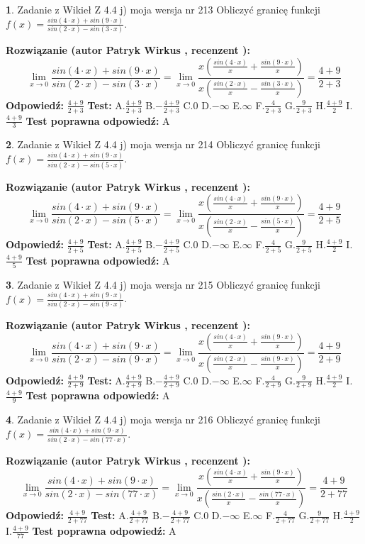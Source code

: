 \documentclass[12pt, a4paper]{article}
\theoremstyle{definition} %
\newtheorem{zad}{}
\newcommand{\zadStart}[1]{\begin{zad}#1\newline}
\newcommand{\zadStop}{\end{zad}}
\newcommand{\rozwStart}[2]{\noindent \textbf{Rozwiązanie (autor #1 , recenzent #2): }\newline}
\newcommand{\rozwStop}{\newline}
\newcommand{\odpStart}{\noindent \textbf{Odpowiedź:}\newline}
\newcommand{\odpStop}{\newline}
\newcommand{\testStart}{\noindent \textbf{Test:}\newline}
\newcommand{\testStop}{\newline}
\newcommand{\kluczStart}{\noindent \textbf{Test poprawna odpowiedź:}\newline}
\newcommand{\kluczStop}{\newline}
\begin{document}
\zadStart{Zadanie z Wikieł Z 4.4 j) moja wersja nr 213}
Obliczyć granicę funkcji $f(x)=\frac{sin(4\cdot x) +sin(9\cdot x)}{sin(2\cdot x) -sin(3\cdot x)}$.
\zadStop
\rozwStart{Patryk Wirkus}{}
$$\lim\limits_{x\to 0}\frac{sin(4\cdot x) +sin(9\cdot x)}{sin(2\cdot x) -sin(3\cdot x)}=\lim\limits_{x\to 0}\frac{x(\frac{sin(4\cdot x)}{x}+\frac{sin(9\cdot x)}{x})}{x(\frac{sin(2\cdot x)}{x}-\frac{sin(3\cdot x)}{x})}=\frac{4+9}{2+3}$$
\rozwStop
\odpStart
$\frac{4+9}{2+3}$
\odpStop
\testStart
A.$\frac{4+9}{2+3}$
B.$-\frac{4+9}{2+3}$
C.$0$
D.$-\infty$
E.$\infty$
F.$\frac{4}{2+3}$
G.$\frac{9}{2+3}$
H.$\frac{4+9}{2}$
I.$\frac{4+9}{3}$
\testStop
\kluczStart
A
\kluczStop



\zadStart{Zadanie z Wikieł Z 4.4 j) moja wersja nr 214}
Obliczyć granicę funkcji $f(x)=\frac{sin(4\cdot x) +sin(9\cdot x)}{sin(2\cdot x) -sin(5\cdot x)}$.
\zadStop
\rozwStart{Patryk Wirkus}{}
$$\lim\limits_{x\to 0}\frac{sin(4\cdot x) +sin(9\cdot x)}{sin(2\cdot x) -sin(5\cdot x)}=\lim\limits_{x\to 0}\frac{x(\frac{sin(4\cdot x)}{x}+\frac{sin(9\cdot x)}{x})}{x(\frac{sin(2\cdot x)}{x}-\frac{sin(5\cdot x)}{x})}=\frac{4+9}{2+5}$$
\rozwStop
\odpStart
$\frac{4+9}{2+5}$
\odpStop
\testStart
A.$\frac{4+9}{2+5}$
B.$-\frac{4+9}{2+5}$
C.$0$
D.$-\infty$
E.$\infty$
F.$\frac{4}{2+5}$
G.$\frac{9}{2+5}$
H.$\frac{4+9}{2}$
I.$\frac{4+9}{5}$
\testStop
\kluczStart
A
\kluczStop



\zadStart{Zadanie z Wikieł Z 4.4 j) moja wersja nr 215}
Obliczyć granicę funkcji $f(x)=\frac{sin(4\cdot x) +sin(9\cdot x)}{sin(2\cdot x) -sin(9\cdot x)}$.
\zadStop
\rozwStart{Patryk Wirkus}{}
$$\lim\limits_{x\to 0}\frac{sin(4\cdot x) +sin(9\cdot x)}{sin(2\cdot x) -sin(9\cdot x)}=\lim\limits_{x\to 0}\frac{x(\frac{sin(4\cdot x)}{x}+\frac{sin(9\cdot x)}{x})}{x(\frac{sin(2\cdot x)}{x}-\frac{sin(9\cdot x)}{x})}=\frac{4+9}{2+9}$$
\rozwStop
\odpStart
$\frac{4+9}{2+9}$
\odpStop
\testStart
A.$\frac{4+9}{2+9}$
B.$-\frac{4+9}{2+9}$
C.$0$
D.$-\infty$
E.$\infty$
F.$\frac{4}{2+9}$
G.$\frac{9}{2+9}$
H.$\frac{4+9}{2}$
I.$\frac{4+9}{9}$
\testStop
\kluczStart
A
\kluczStop



\zadStart{Zadanie z Wikieł Z 4.4 j) moja wersja nr 216}
Obliczyć granicę funkcji $f(x)=\frac{sin(4\cdot x) +sin(9\cdot x)}{sin(2\cdot x) -sin(77\cdot x)}$.
\zadStop
\rozwStart{Patryk Wirkus}{}
$$\lim\limits_{x\to 0}\frac{sin(4\cdot x) +sin(9\cdot x)}{sin(2\cdot x) -sin(77\cdot x)}=\lim\limits_{x\to 0}\frac{x(\frac{sin(4\cdot x)}{x}+\frac{sin(9\cdot x)}{x})}{x(\frac{sin(2\cdot x)}{x}-\frac{sin(77\cdot x)}{x})}=\frac{4+9}{2+77}$$
\rozwStop
\odpStart
$\frac{4+9}{2+77}$
\odpStop
\testStart
A.$\frac{4+9}{2+77}$
B.$-\frac{4+9}{2+77}$
C.$0$
D.$-\infty$
E.$\infty$
F.$\frac{4}{2+77}$
G.$\frac{9}{2+77}$
H.$\frac{4+9}{2}$
I.$\frac{4+9}{77}$
\testStop
\kluczStart
A
\kluczStop
\end{document}
